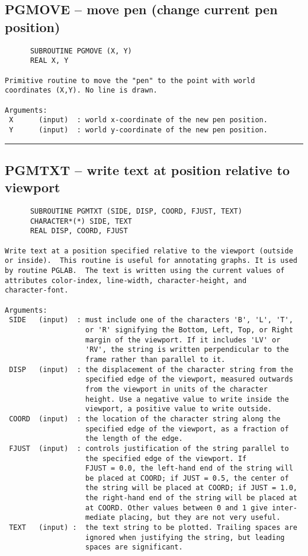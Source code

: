 {\subsection*{PGMOVE -- move pen (change current pen position) }
\begin{verbatim}
      SUBROUTINE PGMOVE (X, Y)
      REAL X, Y

Primitive routine to move the "pen" to the point with world
coordinates (X,Y). No line is drawn.

Arguments:
 X      (input)  : world x-coordinate of the new pen position.
 Y      (input)  : world y-coordinate of the new pen position.
\end{verbatim}
\hrule


\subsection*{PGMTXT -- write text at position relative to viewport }
\begin{verbatim}
      SUBROUTINE PGMTXT (SIDE, DISP, COORD, FJUST, TEXT)
      CHARACTER*(*) SIDE, TEXT
      REAL DISP, COORD, FJUST

Write text at a position specified relative to the viewport (outside
or inside).  This routine is useful for annotating graphs. It is used
by routine PGLAB.  The text is written using the current values of
attributes color-index, line-width, character-height, and
character-font.

Arguments:
 SIDE   (input)  : must include one of the characters 'B', 'L', 'T',
                   or 'R' signifying the Bottom, Left, Top, or Right
                   margin of the viewport. If it includes 'LV' or
                   'RV', the string is written perpendicular to the
                   frame rather than parallel to it.
 DISP   (input)  : the displacement of the character string from the
                   specified edge of the viewport, measured outwards
                   from the viewport in units of the character
                   height. Use a negative value to write inside the
                   viewport, a positive value to write outside.
 COORD  (input)  : the location of the character string along the
                   specified edge of the viewport, as a fraction of
                   the length of the edge.
 FJUST  (input)  : controls justification of the string parallel to
                   the specified edge of the viewport. If
                   FJUST = 0.0, the left-hand end of the string will
                   be placed at COORD; if JUST = 0.5, the center of
                   the string will be placed at COORD; if JUST = 1.0,
                   the right-hand end of the string will be placed at
                   at COORD. Other values between 0 and 1 give inter-
                   mediate placing, but they are not very useful.
 TEXT   (input) :  the text string to be plotted. Trailing spaces are
                   ignored when justifying the string, but leading
                   spaces are significant.


\end{verbatim}}
